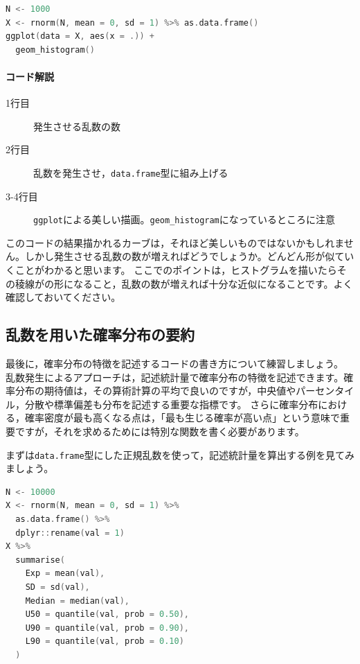\documentclass{ltjsbook}
\begin{document}
\begin{lstlisting}[language=c++,label={code:03_05},caption={確率分布の可視化2}]
N <- 1000
X <- rnorm(N, mean = 0, sd = 1) %>% as.data.frame()
ggplot(data = X, aes(x = .)) +
  geom_histogram()
\end{lstlisting}
\paragraph{コード解説}
\begin{description}
	\item[1行目] 発生させる乱数の数
	\item[2行目] 乱数を発生させ，\texttt{data.frame}型に組み上げる
	\item[3-4行目] \texttt{ggplot}による美しい描画。\verb|geom_histogram|になっているところに注意
\end{description}
このコードの結果描かれるカーブは，それほど美しいものではないかもしれません。しかし発生させる乱数の数が増えればどうでしょうか。どんどん形が似ていくことがわかると思います。
ここでのポイントは，ヒストグラムを描いたらその稜線がの形になること，乱数の数が増えれば十分な近似になることです。よく確認しておいてください。

\subsection{乱数を用いた確率分布の要約}
最後に，確率分布の特徴を記述するコードの書き方について練習しましょう。
乱数発生によるアプローチは，記述統計量で確率分布の特徴を記述できます。確率分布の期待値は，その算術計算の平均で良いのですが，中央値やパーセンタイル，分散や標準偏差も分布を記述する重要な指標です。
さらに確率分布における，確率密度が最も高くなる点は，「最も生じる確率が高い点」という意味で重要ですが，それを求めるためには特別な関数を書く必要があります。

まずは\texttt{data.frame}型にした正規乱数を使って，記述統計量を算出する例を見てみましょう。

\begin{lstlisting}[language=c++,label={code:03_06},caption={確率分布の要約}]
N <- 10000
X <- rnorm(N, mean = 0, sd = 1) %>%
  as.data.frame() %>%
  dplyr::rename(val = 1)
X %>%
  summarise(
    Exp = mean(val),
    SD = sd(val),
    Median = median(val),
    U50 = quantile(val, prob = 0.50),
    U90 = quantile(val, prob = 0.90),
    L90 = quantile(val, prob = 0.10)
  )
\end{lstlisting}
\end{document}

